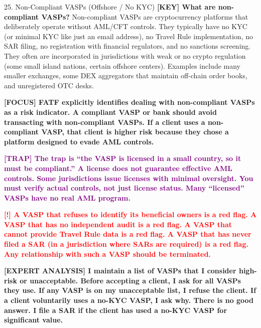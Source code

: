 \documentclass[11pt,a4paper]{beamer}
\newcommand{\redflag}[1]{\textcolor{red}{\textbf{[!] #1}}}
\newcommand{\examfocus}[1]{\textcolor{orange!80!black}{\textbf{[FOCUS] #1}}}
\newcommand{\trap}[1]{\textcolor{purple}{\textbf{[TRAP] #1}}}
\newcommand{\keyterm}[1]{\textcolor{red!80!black}{\textbf{[KEY] #1}}}
\newcommand{\expert}[1]{\textcolor{blue!70!black}{\textbf{[EXPERT ANALYSIS] #1}}}
\begin{document}
	\begin{frame}{25. Non-Compliant VASPs (Offshore / No KYC)}
		\tiny
		\keyterm{What are non-compliant VASPs?} Non-compliant VASPs are cryptocurrency platforms that deliberately operate without AML/CFT controls. They typically have no KYC (or minimal KYC like just an email address), no Travel Rule implementation, no SAR filing, no registration with financial regulators, and no sanctions screening. They often are incorporated in jurisdictions with weak or no crypto regulation (some small island nations, certain offshore centers). Examples include many smaller exchanges, some DEX aggregators that maintain off-chain order books, and unregistered OTC desks.
		
		\vspace{0.1cm}
		\examfocus{FATF explicitly identifies dealing with non-compliant VASPs as a risk indicator. A compliant VASP or bank should avoid transacting with non-compliant VASPs. If a client uses a non-compliant VASP, that client is higher risk because they chose a platform designed to evade AML controls.}
		
		\vspace{0.1cm}
		\trap{The trap is “the VASP is licensed in a small country, so it must be compliant.” A license does not guarantee effective AML controls. Some jurisdictions issue licenses with minimal oversight. You must verify actual controls, not just license status. Many “licensed” VASPs have no real AML program.}
		
		\vspace{0.1cm}
		\redflag{A VASP that refuses to identify its beneficial owners is a red flag. A VASP that has no independent audit is a red flag. A VASP that cannot provide Travel Rule data is a red flag. A VASP that has never filed a SAR (in a jurisdiction where SARs are required) is a red flag. Any relationship with such a VASP should be terminated.}
		
		\vspace{0.1cm}
		\expert{I maintain a list of VASPs that I consider high-risk or unacceptable. Before accepting a client, I ask for all VASPs they use. If any VASP is on my unacceptable list, I refuse the client. If a client voluntarily uses a no-KYC VASP, I ask why. There is no good answer. I file a SAR if the client has used a no-KYC VASP for significant value.}
	\end{frame}
	
\end{document}

